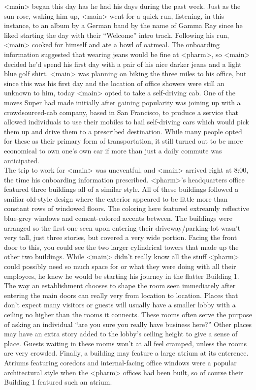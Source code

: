 \documentclass[12pt,openany]{memoir}
\begin{document}
<main> began this day has he had his days during the past week.
Just as the sun rose, waking him up, <main> went for a quick run, listening, in this instance, to an album by a German band by the name of Gamma Ray since he liked starting the day with their ``Welcome'' intro track.
Following his run, <main> cooked for himself and ate a bowl of oatmeal.
The onboarding information suggested that wearing jeans would be fine at <pharm>, so <main> decided he'd spend his first day with a pair of his nice darker jeans and a light blue golf shirt.
<main> was planning on biking the three miles to his office, but since this was his first day and the location of office showers were still an unknown to him, today <main> opted to take a self-driving cab.
One of the moves Super had made initially after gaining popularity was joining up with a crowdsourced-cab company, based in San Francisco, to produce a service that allowed individuals to use their mobiles to hail self-driving cars which would pick them up and drive them to a prescribed destination.
While many people opted for these as their primary form of transportation, it still turned out to be more economical to own one's own car if more than just a daily commute was anticipated.
\\

The trip to work for <main> was uneventful, and <main> arrived right at 8:00, the time his onboarding information prescribed.
<pharm>'s headquarters office featured three buildings all of a similar style.
All of these buildings followed a smiliar old-style design where the exterior appeared to be little more than constant rows of windowed floors.
The coloring here featured extreamly reflective blue-grey windows and cement-colored accents between.
The buildings were arranged so the first one seen upon entering their driveway/parking-lot wasn't very tall, just three stories, but covered a very wide portion.
Facing the front door to this, you could see the two larger cylindrical towers that made up the other two buildings.
While <main> didn't really know all the stuff <pharm> could possibly need so much space for or what they were doing with all their employees, he knew he would be starting his journey in the flatter Building 1.
\\

The way an establishment chooses to shape the room seen immediately after entering the main doors can really very from location to location.
Places that don't expect many visitors or guests will usually have a smaller lobby with a ceiling no higher than the rooms it connects.
These rooms often serve the purpose of asking an individual ``are you sure you really have business here?''
Other places may have an extra story added to the lobby's ceiling height to give a sense of place.
Guests waiting in these rooms won't at all feel cramped, unless the rooms are very crowded.
Finally, a building may feature a large atrium at its enterence.
Atriums featuring coredors and internal-facing office windows were a popular architectural style when the <pharm> offices had been built, so of course their Building 1 featured such an atrium.
\\
\end{document}
